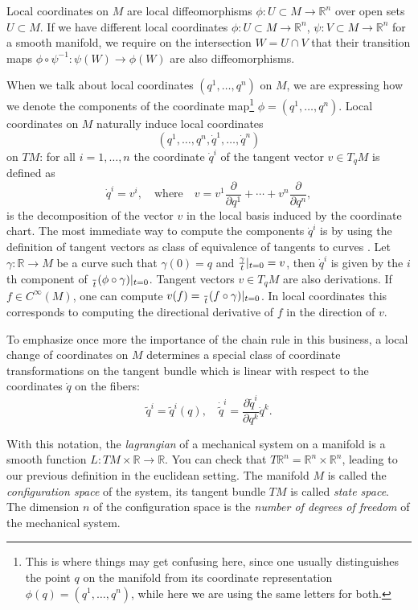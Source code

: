 \documentclass[english,fontsize=11pt,paper=a5,oneside]{scrbook}
\newcommand{\R}{\mathbb{R}}
\let\d\relax
\newcommand{\d}{\mathrm{d}}
\newcommand{\der}[2]{\frac{\d{#1}}{\d{#2}}}
\theoremstyle{definition}
\begin{document}
Local coordinates on $M$ are local diffeomorphisms $\phi:U\subset M\to \R^n$ over open sets $U\subset M$. If we have different local coordinates $\phi:U\subset M\to\R^n$, $\psi:V\subset M\to\R^n$ for a smooth manifold, we require on the intersection $W=U\cap V$ that their transition maps $\phi\circ\psi^{-1}:\psi(W)\to\phi(W)$ are also diffeomorphisms.

When we talk about local coordinates $(q^1,\ldots,q^n)$ on $M$, we are expressing how we denote the components of the coordinate map\footnote{This is where things may get confusing here, since one usually distinguishes the point $q$ on the manifold from its coordinate representation $\phi(q)=(q^1, \ldots, q^n)$, while here we are using the same letters for both.} $\phi=(q^1, \ldots, q^n)$.
Local coordinates on $M$ naturally induce local coordinates \[(q^1,\ldots,q^n,\dot q^1, \ldots,\dot q^n)\] on $TM$: for all $i=1,\ldots,n$ the coordinate $\dot q^i$ of the tangent vector $v\in T_qM$ is defined as
\begin{equation}
  \dot q^i = v^i,\quad\mbox{where}\quad v = v^1\frac{\partial}{\partial q^1}+\cdots+v^n \frac{\partial}{\partial q^n},
\end{equation}
is the decomposition of the vector $v$ in the local basis induced by the coordinate chart.
The most immediate way to compute the components $\dot q^i$ is by using the definition of tangent vectors as class of equivalence of tangents to curves \cite[Chapter 2.5]{lectures:aom:seri}.
Let $\gamma:\R \to M$ be a curve such that $\gamma(0) = q$ and $\der{\gamma}{t}|_{t=0} = v$, then $\dot q^i$ is given by the $i$th component of $\der{}{t}(\phi\circ\gamma)|_{t=0}$.
Tangent vectors $v\in T_qM$ are also derivations. If $f\in C^\infty(M)$, one can compute $v(f)=\der{}{t}(f\circ\gamma)|_{t=0}$. In local coordinates this corresponds to computing the directional derivative of $f$ in the direction of $v$.

To emphasize once more the importance of the chain rule in this business, a local change of coordinates on $M$ determines a special class of coordinate transformations on the tangent bundle which is linear with respect to the coordinates $\dot q$ on the fibers:
\begin{equation}
  \widetilde q^i = \widetilde q^i (q), \quad \dot{\widetilde q}^i = \frac{\partial\widetilde q^i}{\partial q^k}\dot q^k.
\end{equation}

With this notation, the \emph{lagrangian} of a mechanical system on a manifold is a smooth function $L : TM\times\R \to \R$.
You can check that $T\R^n = \R^n \times \R^n$, leading to our previous definition in the euclidean setting.
The manifold $M$ is called the \emph{configuration space} of the system, its tangent bundle $TM$ is called \emph{state space}. The dimension $n$ of the configuration space is the \emph{number of degrees of freedom} of the mechanical system.
\end{document}
